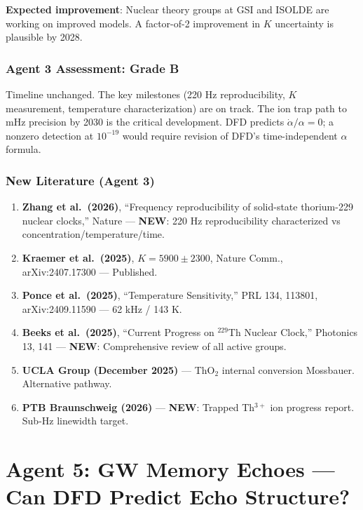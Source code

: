 \documentclass[11pt,a4paper]{article}
\newcommand{\NEW}{\textcolor{dfdblue}{\textbf{NEW}}}
\begin{document}
\textbf{Expected improvement}: Nuclear theory groups at GSI and ISOLDE are working on improved models. A factor-of-2 improvement in $K$ uncertainty is plausible by 2028.

\section{Agent 3 Assessment: Grade B}

Timeline unchanged. The key milestones (220 Hz reproducibility, $K$ measurement, temperature characterization) are on track. The ion trap path to mHz precision by 2030 is the critical development. DFD predicts $\dot{\alpha}/\alpha = 0$; a nonzero detection at $10^{-19}$ would require revision of DFD's time-independent $\alpha$ formula.

\section{New Literature (Agent 3)}

\begin{enumerate}
\item \textbf{Zhang et al.\ (2026)}, ``Frequency reproducibility of solid-state thorium-229 nuclear clocks,'' Nature --- \NEW: 220 Hz reproducibility characterized vs concentration/temperature/time.

\item \textbf{Kraemer et al.\ (2025)}, $K = 5900 \pm 2300$, Nature Comm., arXiv:2407.17300 --- Published.

\item \textbf{Ponce et al.\ (2025)}, ``Temperature Sensitivity,'' PRL 134, 113801, arXiv:2409.11590 --- 62 kHz / 143 K.

\item \textbf{Beeks et al.\ (2025)}, ``Current Progress on $^{229}$Th Nuclear Clock,'' Photonics 13, 141 --- \NEW: Comprehensive review of all active groups.

\item \textbf{UCLA Group (December 2025)} --- ThO$_2$ internal conversion Mossbauer. Alternative pathway.

\item \textbf{PTB Braunschweig (2026)} --- \NEW: Trapped Th$^{3+}$ ion progress report. Sub-Hz linewidth target.
\end{enumerate}


\part{Agent 5: GW Memory Echoes --- Can DFD Predict Echo Structure?}
\label{part:agent5}
\end{document}
